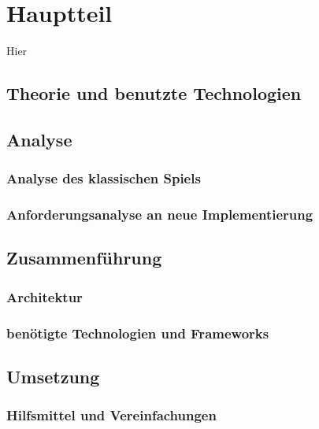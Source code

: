 \chapter{Hauptteil}
\label{cha:Hauptteil}

Hier\todo

\section{Theorie und benutzte Technologien}
\label{sec:theorie}

\section{Analyse}
\label{sec:analyse}

\subsection{Analyse des klassischen Spiels}
\label{subsec:spiel_analyse}

\subsection{Anforderungsanalyse an neue Implementierung}
\label{subsec:neueImpl_analyse}

\section{Zusammenf\"uhrung}
\label{sec:zusammenfuhrung}

\subsection{Architektur}
\label{subsec:Architektur}

\subsection{ben\"otigte Technologien und Frameworks}
\label{subsec:Technologien}

\section{Umsetzung}
\label{sec:Umsetzung}

\subsection{Hilfsmittel und Vereinfachungen}
\label{subsec:Hilfsmittel}

